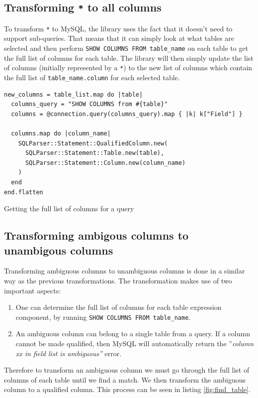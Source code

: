 \subsection{Transforming \texttt{*} to all columns}
To transform \texttt{*} to MySQL, the library uses the fact that it doesn't need to support sub-queries. That means that it can simply look at what tables are selected and then perform \texttt{SHOW COLUMNS FROM table_name} on each table to get the full list of columns for each table. The library will then simply update the list of columns (initially represented by a \texttt{*}) to the new list of columns which contain the full list of \texttt{table\_name.column} for each selected table.

\begin{code}
\begin{verbatim}
new_columns = table_list.map do |table|
  columns_query = "SHOW COLUMNS from #{table}"
  columns = @connection.query(columns_query).map { |k| k["Field"] }

  columns.map do |column_name|
    SQLParser::Statement::QualifiedColumn.new(
      SQLParser::Statement::Table.new(table),
      SQLParser::Statement::Column.new(column_name)
    )
  end
end.flatten
\end{verbatim}
\caption{Getting the full list of columns for a query}
\end{code}

\subsection{Transforming ambigous columns to unambigous columns}
Transforming ambiguous columns to unambiguous columns is done in a similar way as the previous transformations. The transformation makes use of two important aspects:
\begin{enumerate}
    \item One can determine the full list of columns for each table expression component, by running \texttt{SHOW COLUMNS FROM table_name}.
    \item An ambiguous column can belong to a single table from a query. If a column cannot be made qualified, then MySQL will automatically return the ''\textit{column xx in field list is ambiguous''} error.
\end{enumerate}

Therefore to transform an ambiguous column we must go through the full list of columns of each table until we find a match. We then transform the ambiguous column to a qualified column. This process can be seen in listing \ref{fig:find_table}.

